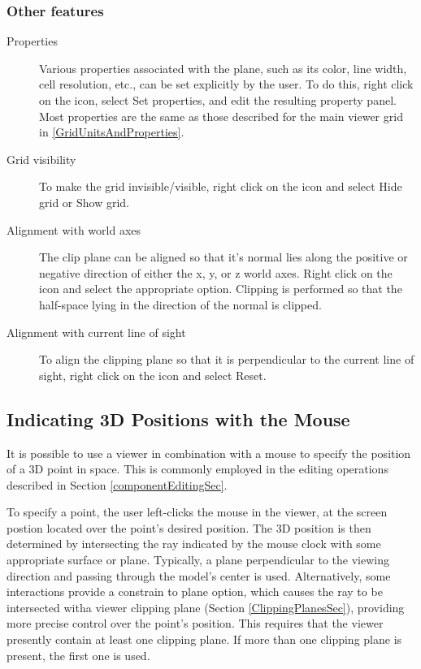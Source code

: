 \documentclass{article}
\begin{document}
\subsubsection{Other features}

\begin{description}

\item[Properties]\mbox{}

Various properties associated with the plane, such as its color, line
width, cell resolution, etc., can be set explicitly by the user. To do
this, right click on the icon, select {\sf Set properties}, and edit
the resulting property panel.  Most properties are the same as those
described for the main viewer grid in \ref{GridUnitsAndProperties}.

\item[Grid visibility]\mbox{}

To make the grid invisible/visible, right click on the icon
and select {\sf Hide grid} or {\sf Show grid}.

\item[Alignment with world axes]\mbox{}

The clip plane can be aligned so that it's
normal lies along the positive or negative direction of either the x,
y, or z world axes. Right click on the icon and select the
appropriate option. Clipping is performed so that
the half-space lying in the direction of the normal is clipped.

\item[Alignment with current line of sight]\mbox{}

To align the clipping plane so that it is perpendicular to the
current line of sight, right click on the icon and select {\sf Reset}.

\end{description}

\subsection{Indicating 3D Positions with the Mouse}
\label{indicatingPositionsSec}

It is possible to use a viewer in combination with a mouse to specify the
position of a 3D point in space. This is commonly employed in the
editing operations described in Section \ref{componentEditingSec}.

To specify a point, the user left-clicks the mouse in the viewer, at
the screen postion located over the point's desired position. The 3D
position is then determined by intersecting the ray indicated by the
mouse clock with some appropriate surface or plane. Typically, a plane
perpendicular to the viewing direction and passing through the model's
center is used. Alternatively, some interactions provide a {\sf constrain
to plane} option, which causes the ray to be intersected witha viewer
clipping plane (Section \ref{ClippingPlanesSec}), providing more precise control
over the point's position. This requires that the viewer presently
contain at least one clipping plane. If more than one clipping plane
is present, the first one is used.
\end{document}
